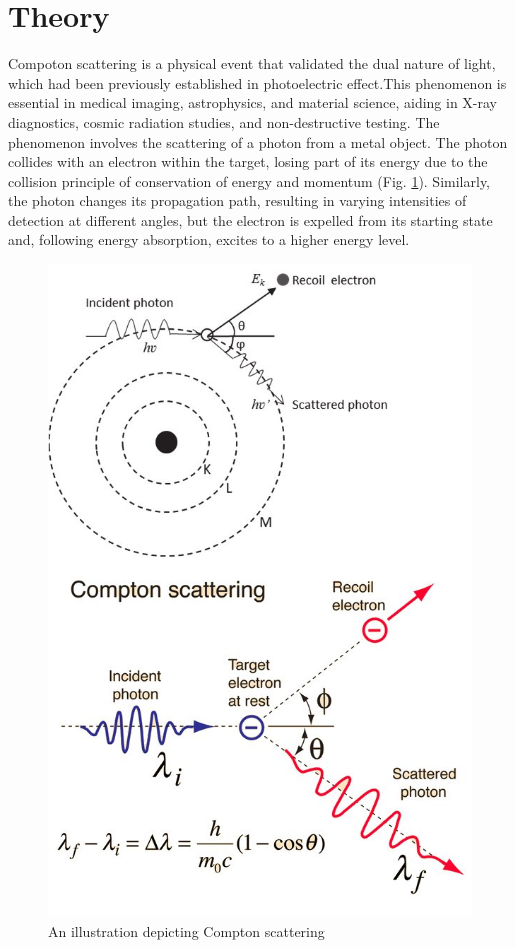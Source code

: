 \section{Theory}

Compoton scattering is a physical event that validated the dual nature of light, which had been previously established in photoelectric effect.This phenomenon is essential in medical imaging, astrophysics, and material science, aiding in X-ray diagnostics, cosmic radiation studies, and non-destructive
testing. The phenomenon involves the scattering of a photon from a metal object. The photon collides with an electron within the target, losing part of its energy due to the collision principle of conservation of energy and momentum (Fig. \ref{th:1}). Similarly, the photon changes its propagation path, resulting in varying intensities of detection at different angles, but the electron is expelled from its starting state and, following energy absorption, excites to a higher energy level.

\begin{figure}
    \centering
    \includegraphics[width=0.8\columnwidth]{images/theory.png}
    \caption{An illustration depicting Compton scattering}
    \label{th:1}
\end{figure}

